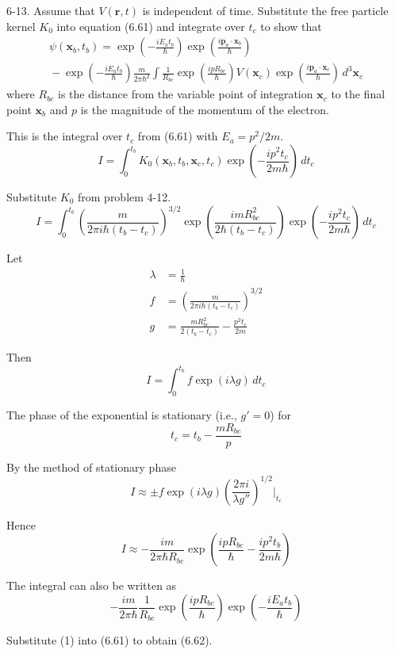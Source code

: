 \documentclass[12pt]{article}
\begin{document}
6-13.
Assume that $V(\mathbf r,t)$ is independent of time.
Substitute the free particle kernel $K_0$ into equation
(6.61) and integrate over $t_c$ to show that
\begin{multline*}
\psi(\mathbf x_b,t_b)=
\exp\left(-\frac{iE_at_b}{\hbar}\right)
\exp\left(\frac{i\mathbf p_a\cdot\mathbf x_b}{\hbar}\right)
\\
{}-\exp\left(-\frac{iE_at_b}{\hbar}\right)
\frac{m}{2\pi\hbar^2}
\int
\frac{1}{R_{bc}}
\exp\left(\frac{ipR_{bc}}{\hbar}\right)
V(\mathbf x_c)
\exp\left(\frac{i\mathbf p_a\cdot\mathbf x_c}{\hbar}\right)
\,d^3\mathbf x_c
\tag{6.62}
\end{multline*}
where $R_{bc}$ is the distance from the variable point of integration
$\mathbf x_c$ to the final point $\mathbf x_b$ and $p$ is the
magnitude of the momentum of the electron.

\bigskip
This is the integral over $t_c$ from (6.61) with $E_a=p^2/2m$.
\begin{equation*}
I=\int_0^{t_b}K_0(\mathbf x_b,t_b,\mathbf x_c,t_c)
\exp\left(-\frac{ip^2t_c}{2m\hbar}\right)
\,dt_c
\end{equation*}

Substitute $K_0$ from problem 4-12.
\begin{equation*}
I=\int_0^{t_b}
\left(\frac{m}{2\pi i\hbar(t_b-t_c)}\right)^{3/2}
\exp\left(\frac{imR_{bc}^2}{2\hbar(t_b-t_c)}\right)
\exp\left(-\frac{ip^2t_c}{2m\hbar}\right)
\,dt_c
\end{equation*}

Let
\begin{align*}
\lambda&=\frac{1}{\hbar}
\\
f&=\left(\frac{m}{2\pi i\hbar(t_b-t_c)}\right)^{3/2}
\\
g&=\frac{m R_{bc}^2}{2(t_b-t_c)}-\frac{p^2t_c}{2m}
\end{align*}

Then
\begin{equation*}
I=\int_0^{t_b}f\exp(i\lambda g)\,dt_c
\end{equation*}

The phase of the exponential is stationary (i.e., $g'=0$) for
\begin{equation*}
t_c=t_b-\frac{mR_{bc}}{p}
\end{equation*}

By the method of stationary phase
\begin{equation*}
I\approx\pm f\exp(i\lambda g)\left(\frac{2\pi i}{\lambda g''}\right)^{1/2}\bigg|_{t_c}
\end{equation*}

Hence
\begin{equation*}
I\approx-\frac{im}{2\pi\hbar R_{bc}}
\exp\left(\frac{ipR_{bc}}{\hbar}-\frac{ip^2t_b}{2m\hbar}\right)
\end{equation*}

The integral can also be written as
\begin{equation*}
-\frac{im}{2\pi\hbar}
\frac{1}{R_{bc}}
\exp\left(\frac{ipR_{bc}}{\hbar}\right)
\exp\left(-\frac{iE_at_b}{\hbar}\right)
\tag{1}
\end{equation*}

Substitute (1) into (6.61) to obtain (6.62).
\end{document}

